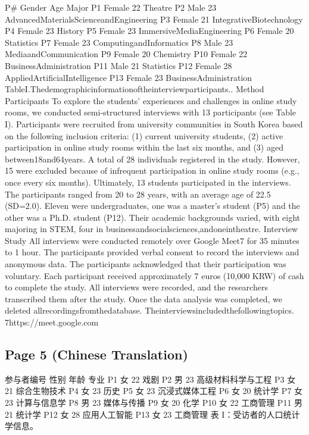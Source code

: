 \documentclass[12pt]{ctexart}
\begin{document}
P\# Gender Age Major
P1 Female 22 Theatre
P2 Male 23 AdvancedMaterialsScienceandEngineering
P3 Female 21 IntegrativeBiotechnology
P4 Female 23 History
P5 Female 23 ImmersiveMediaEngineering
P6 Female 20 Statistics
P7 Female 23 ComputingandInformatics
P8 Male 23 MediaandCommunication
P9 Female 20 Chemistry
P10 Female 22 BusinessAdministration
P11 Male 21 Statistics
P12 Female 28 AppliedArtificialIntelligence
P13 Female 23 BusinessAdministration
TableI.Thedemographicinformationoftheinterviewparticipants..
Method
Participants
To explore the students’ experiences and challenges in online study rooms, we
conducted semi-structured interviews with 13 participants (see Table I).
Participants were recruited from university communities in South Korea based on
the following inclusion criteria: (1) current university students, (2) active
participation in online study rooms within the last six months, and (3) aged
between18and64years.
A total of 28 individuals registered in the study. However, 15 were excluded
because of infrequent participation in online study rooms (e.g., once every six
months). Ultimately, 13 students participated in the interviews. The participants
ranged from 20 to 28 years, with an average age of 22.5 (SD=2.0). Eleven were
undergraduates, one was a master’s student (P5) and the other was a Ph.D. student
(P12). Their academic backgrounds varied, with eight majoring in STEM, four in
businessandsocialsciences,andoneintheatre.
Interview Study
All interviews were conducted remotely over Google Meet7 for 35 minutes to 1
hour. The participants provided verbal consent to record the interviews and
anonymous data. The participants acknowledged that their participation was
voluntary. Each participant received approximately 7 euros (10,000 KRW) of cash
to complete the study. All interviews were recorded, and the researchers
transcribed them after the study. Once the data analysis was completed, we deleted
allrecordingsfromthedatabase. Theinterviewsincludedthefollowingtopics.
7https://meet.google.com

\subsection*{Page 5 (Chinese Translation)}

参与者编号  性别  年龄  专业
P1 女 22 戏剧
P2 男 23 高级材料科学与工程
P3 女 21 综合生物技术
P4 女 23 历史
P5 女 23 沉浸式媒体工程
P6 女 20 统计学
P7 女 23 计算与信息学
P8 男 23 媒体与传播
P9 女 20 化学
P10 女 22 工商管理
P11 男 21 统计学
P12 女 28 应用人工智能
P13 女 23 工商管理
表 I：受访者的人口统计学信息。
\end{document}
